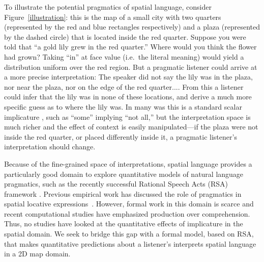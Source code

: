 \documentclass[10pt,letterpaper]{article}
\begin{document}
To illustrate the potential pragmatics of spatial language, consider Figure~\ref{illustration}: this is the map of a small city with two quarters (represented by the red and blue rectangles respectively) and a plaza (represented by the dashed circle) that is located inside the red quarter. 
Suppose you were told that ``a gold lily grew in the red quarter.'' Where would you think the flower had grown? 
Taking ``in'' at face value (i.e.~the literal meaning) would yield a distribution uniform over the red region.
But a pragmatic listener could arrive at a more precise interpretation: The speaker did not say the lily was in the plaza, nor near the plaza, nor on the edge of the red quarter.... From this a listener could infer that the lily was in none of these locations, and derive a much more specific guess as to where the lily was.
In many was this is a standard scalar implicature \cite{horn84}, such as ``some'' implying ``not all,'' but the interpretation space is much richer and the effect of context is easily manipulated---if the plaza were not inside the red quarter, or placed differently inside it, a pragmatic listener's interpretation should change.


Because of the fine-grained space of interpretations, spatial language provides a particularly good domain to explore quantitative models of natural language pragmatics, such as the recently successful Rational Speech Acts (RSA) framework \cite{frankgoodman2012,ndg+ast:topics2013}.
Previous empirical work has discussed the role of pragmatics in spatial locative expressions~\cite{herskovits85,herskovits87}. 
However, formal work in this domain is scarce and recent computational studies have emphasized production \cite{carstensen14,golland10} over comprehension.
Thus, no studies have looked at the quantitative effects of implicature in the spatial domain.
 We seek to bridge this gap with a formal model, based on RSA, that makes quantitative predictions about a listener's interprets spatial language in a 2D map domain. 
\end{document}
